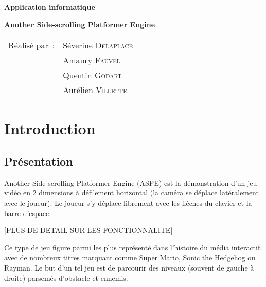 \documentclass[a4paper,11pt]{article}
\begin{document}
\begin{titlepage}
\hspace{3cm}
\vspace{4cm}
\begin{center}
\begin{Huge}
\bfseries Application informatique

\vspace{3cm}
\bfseries Another Side-scrolling Platformer Engine
\end{Huge}
\end{center}

\vspace{2cm}

\begin{center}
\begin{tabular}{ll}
  Réalisé par~: & Séverine \textsc{Delaplace}\\
  				& Amaury \textsc{Fauvel}\\
                & Quentin \textsc{Godart}\\
                & Aurélien \textsc{Villette}\\
\end{tabular}
\end{center}
\end{titlepage}



\newpage
\tableofcontents
\newpage




\vspace{1cm}
\section{Introduction}
\subsection{Présentation}
Another Side-scrolling Platformer Engine (ASPE) est la démonstration d'un jeu-vidéo en 2 dimensions à défilement horizontal (la caméra se déplace latéralement avec le joueur). Le joueur s'y déplace librement avec les flèches du clavier et la barre d'espace.

[PLUS DE DETAIL SUR LES FONCTIONNALITE]

Ce type de jeu figure parmi les plus représenté dans l'histoire du média interactif, avec de nombreux titres marquant comme Super Mario, Sonic the Hedgehog ou Rayman. Le but d'un tel jeu est de parcourir des niveaux (souvent de gauche à droite) parsemés d'obstacle et ennemis.
\end{document}
